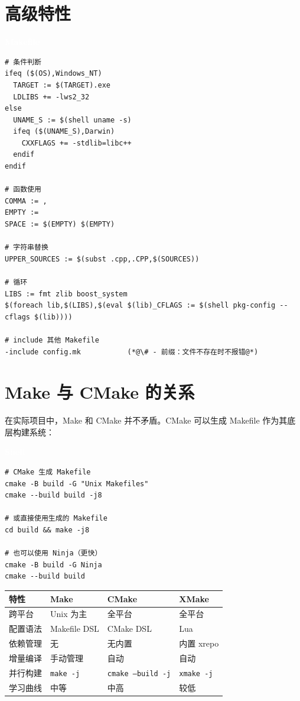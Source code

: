 \documentclass[12pt,a4paper,fontset=fandol]{ctexbook}
\newcommand{\Tp}[1]{\texttt{#1}}
\newcommand{\makelabelcmd}{%
  \noindent\begin{tcolorbox}[sharp corners,colback=makeheadbg,colframe=makeheadbg,
    left=6pt,right=6pt,top=2pt,bottom=2pt,boxrule=0pt]
  \textcolor{white}{\small\bfseries\sffamily Makefile}\end{tcolorbox}%
}
\newcommand{\bashlabel}{%
  \noindent\begin{tcolorbox}[sharp corners,colback=cfgheadbg,colframe=cfgheadbg,
    left=6pt,right=6pt,top=2pt,bottom=2pt,boxrule=0pt]
  \textcolor{white}{\small\bfseries\sffamily Shell}\end{tcolorbox}%
}
\begin{document}
\section{高级特性}

\makelabelcmd
\begin{lstlisting}[style=bashstyle]
# 条件判断
ifeq ($(OS),Windows_NT)
  TARGET := $(TARGET).exe
  LDLIBS += -lws2_32
else
  UNAME_S := $(shell uname -s)
  ifeq ($(UNAME_S),Darwin)
    CXXFLAGS += -stdlib=libc++
  endif
endif

# 函数使用
COMMA := ,
EMPTY :=
SPACE := $(EMPTY) $(EMPTY)

# 字符串替换
UPPER_SOURCES := $(subst .cpp,.CPP,$(SOURCES))

# 循环
LIBS := fmt zlib boost_system
$(foreach lib,$(LIBS),$(eval $(lib)_CFLAGS := $(shell pkg-config --cflags $(lib))))

# include 其他 Makefile
-include config.mk           (*@\# - 前缀：文件不存在时不报错@*)
\end{lstlisting}

\section{Make 与 CMake 的关系}

在实际项目中，Make 和 CMake 并不矛盾。CMake 可以生成 Makefile 作为其底层构建系统：

\bashlabel
\begin{lstlisting}[style=bashstyle]
# CMake 生成 Makefile
cmake -B build -G "Unix Makefiles"
cmake --build build -j8

# 或直接使用生成的 Makefile
cd build && make -j8

# 也可以使用 Ninja（更快）
cmake -B build -G Ninja
cmake --build build
\end{lstlisting}

\begin{compare}[title=Make vs CMake vs XMake]
\begin{tabularx}{\textwidth}{lXXX}
\toprule
\textbf{特性} & \textbf{Make} & \textbf{CMake} & \textbf{XMake} \\
\midrule
跨平台 & Unix 为主 & 全平台 & 全平台 \\
配置语法 & Makefile DSL & CMake DSL & Lua \\
依赖管理 & 无 & 无内置 & 内置 xrepo \\
增量编译 & 手动管理 & 自动 & 自动 \\
并行构建 & \Tp{make -j} & \Tp{cmake --build -j} & \Tp{xmake -j} \\
学习曲线 & 中等 & 中高 & 较低 \\
\bottomrule
\end{tabularx}
\end{compare}
\end{document}
